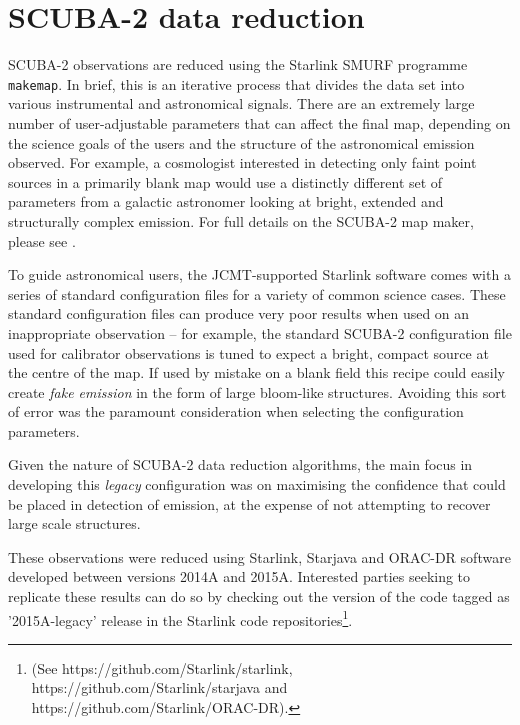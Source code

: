 \documentclass[usenatbib]{mnras}
\begin{document}
\section{SCUBA-2 data reduction}
SCUBA-2 observations are reduced using the Starlink SMURF programme
\texttt{makemap}. In brief, this is an iterative process that divides
the data set into various instrumental and astronomical signals. There
are an extremely large number of user-adjustable parameters that can
affect the final map, depending on the science goals of the users and
the structure of the astronomical emission observed. For example, a
cosmologist interested in detecting only faint point sources in a
primarily blank map would use a distinctly different set of parameters
from a galactic astronomer looking at bright, extended and
structurally complex emission. For full details on the SCUBA-2 map
maker, please see \citet{Chapin2013}.

To guide astronomical users, the JCMT-supported Starlink software
comes with a series of standard configuration files for a variety of
common science cases.
These standard configuration files can produce very poor results when used on an
inappropriate observation -- for example, the standard SCUBA-2 configuration file
used for calibrator observations is tuned to expect a bright, compact
source at the centre of the map. If used by mistake on a blank field
this recipe could easily create \emph{fake emission} in the form of
large bloom-like structures. Avoiding this sort of error was the
paramount consideration when selecting the configuration parameters.

Given the nature of SCUBA-2 data reduction algorithms, the main focus
in developing this \emph{legacy} configuration was on maximising the
confidence that could be placed in detection of emission, at the
expense of not attempting to recover large scale structures.

These observations were reduced using Starlink, Starjava and ORAC-DR
software developed between versions 2014A and 2015A. Interested
parties seeking to replicate these results can do so by checking out the
version of the code tagged as '2015A-legacy' release in the Starlink code repositories\footnote{(See
  https://github.com/Starlink/starlink,
  https://github.com/Starlink/starjava and
  https://github.com/Starlink/ORAC-DR).}.
\end{document}
